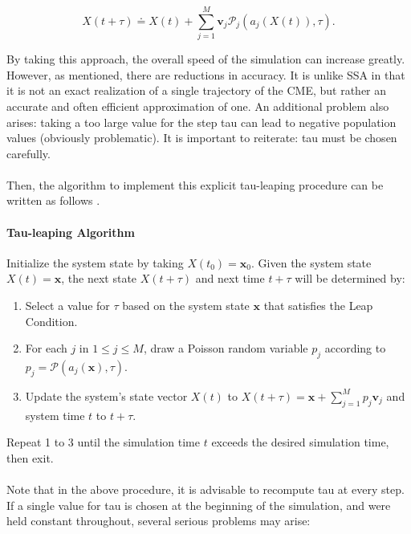 \documentclass[ugrad,lot,lof,openright,11pt,oneside,onehalfspace]{RUthesis}
\begin{document}
				\begin{equation}\label{tau_leaping}
				X(t+\tau) \doteq X(t) + \sum\limits_{j=1}^{M} \mathbf{v}_j \mathcal{P}_j(a_j(X(t)),\tau).
				\end{equation}

				\noindent
				By taking this approach, the overall speed of the simulation can increase greatly. However, as mentioned, there are reductions in accuracy. It is unlike SSA in that it is not an exact realization of a single trajectory of the CME, but rather an accurate and often efficient approximation of one. An additional problem also arises: taking a too large value for the step tau can lead to negative population values (obviously problematic). It is important to reiterate: tau must be chosen carefully.
				\\
				\\
				Then, the algorithm to implement this explicit tau-leaping procedure can be written as follows \cite{sim_chem_reactions}.

				\paragraph{Tau-leaping Algorithm}
				Initialize the system state by taking $X(t_0) = \mathbf{x}_0$. Given the system state $X(t) = \mathbf{x}$, the next state $X(t+\tau)$ and next time $t+\tau$ will be determined by:

				\begin{enumerate}
					\item Select a value for $\tau$ based on the system state $\mathbf{x}$ that satisfies the Leap Condition.
					\item For each $j$ in $1 \leq j \leq M$, draw a Poisson random variable $p_j$ according to $p_j = \mathcal{P}(a_j(\mathbf{x}),\tau)$.
					\item Update the system's state vector $X(t)$ to $X(t+\tau) = \mathbf{x} + \sum_{j=1}^{M} p_j\mathbf{v}_j$ and system time $t$ to $t+\tau$.
				\end{enumerate}

				\noindent
				Repeat 1 to 3 until the simulation time $t$ exceeds the desired simulation time, then exit.\\
				\\
				Note that in the above procedure, it is advisable to recompute tau at every step. If a single value for tau is chosen at the beginning of the simulation, and were held constant throughout, several serious problems may arise:
\end{document}
